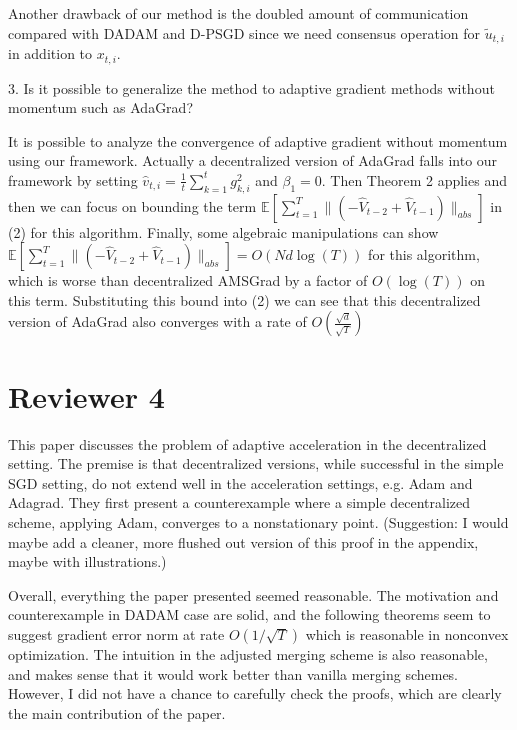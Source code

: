 \documentclass{article} %
\begin{document}
Another drawback of our method is the doubled amount of communication compared with DADAM and D-PSGD since we need consensus operation for $\tilde{u}_{t,i}$ in addition to $x_{t,i}$. 


3. Is it possible to generalize the method to adaptive gradient methods without momentum such as AdaGrad? 

It is possible to analyze the convergence of adaptive gradient without momentum using our framework. Actually a decentralized version of AdaGrad falls into our framework by setting $\hat v_{t,i}  = \frac{1}{t}\sum_{k=1}^t g_{k,i}^2$ and $\beta_1 = 0$. Then  Theorem 2 applies and then we can focus on bounding the term $\mathbb{E}[\sum_{t=1}^T \lVert (-\hat{V}_{t-2} + \hat{V}_{t-1}) \rVert_{abs}]$ in (2) for this algorithm. Finally, some algebraic manipulations can show $\mathbb{E}[\sum_{t=1}^T \lVert (-\hat{V}_{t-2} + \hat{V}_{t-1}) \rVert_{abs}] = O(Nd\log(T))$ for this algorithm, which is worse than decentralized AMSGrad by a factor of $O(\log(T))$ on this term. Substituting this bound into (2) we can see that this decentralized version of AdaGrad also converges with a rate of $O(\frac{\sqrt{d}}{\sqrt{T}})$






\section{Reviewer 4}
\vspace{-0.1in}

This paper discusses the problem of adaptive acceleration in the decentralized setting. The premise is that decentralized versions, while successful in the simple SGD setting, do not extend well in the acceleration settings, e.g. Adam and Adagrad. They first present a counterexample where a simple decentralized scheme, applying Adam, converges to a nonstationary point. (Suggestion: I would maybe add a cleaner, more flushed out version of this proof in the appendix, maybe with illustrations.)

Overall, everything the paper presented seemed reasonable. The motivation and counterexample in DADAM case are solid, and the following theorems seem to suggest gradient error norm  at rate $O(1/\sqrt{T})$ which is reasonable in nonconvex optimization. The intuition in the adjusted merging scheme is also reasonable, and makes sense that it would work better than vanilla merging schemes. However, I did not have a chance to carefully check the proofs, which are clearly the main contribution of the paper.
\end{document}
